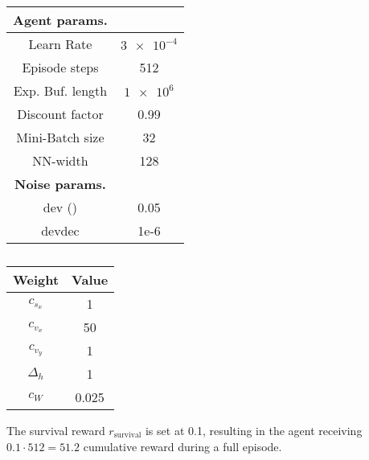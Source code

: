 {\begin{table}
{\begin{tabular}{| c | c |}
		\hline
		\textbf{Agent params.} &  \\ [0.5ex] 
		\hline
		
		Learn Rate & $\num{3e-4}$ \\
		
		Episode steps & 512 \\
		
		Exp. Buf. length & $\num{1e6}$ \\
		
		Discount factor &  0.99 \\
		
		Mini-Batch size & 32 \\
		
		NN-width & 128 \\
		
		\hline
		\textbf{Noise params.} &  \\ [0.5ex] 
		\hline
		
		dev (\textsigma) & 0.05 \\
		
		devdec & 1e-6 \\
		
		\hline
		\end{tabular}
		\caption[PPO agent parameters]{}
		\label{table:PPO parameters}
	}
\end{table}
}

{\def\arraystretch{1.4}\tabcolsep=5pt
\begin{table}
	\centering
	\begin{tabular}{| c | c |}
		\hline
		\textbf{Weight} & \textbf{Value}\\
		\hline
		\hline
		$c_{s_x}$   		&  1	\\
		$c_{v_x}$   	    &  50	\\
	  	$c_{v_y}$  		    &  1	\\
	  	$\Delta_h$  		&  1	\\
	  	$c_W$ 				&  0.025\\
		\hline
	\end{tabular}
	\caption[Reward weights]{}
	\label{table: Reward weights}
\end{table}
}

The survival reward $r_\text{survival}$ is set at 0.1, resulting in the agent receiving $0.1 \cdot 512 = 51.2$ cumulative reward during a full episode.


